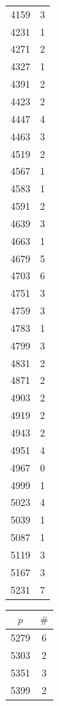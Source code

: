 \documentclass{article}
\theoremstyle{definition}
\begin{document}
\begin{table}[htbp]
\begin{minipage}{0.135\textwidth}
\begin{tabular}{c|c}
        4159 & 3 \\
        4231 & 1 \\
        4271 & 2 \\
        4327 & 1 \\
        4391 & 2 \\
        4423 & 2 \\
        4447 & 4 \\
        4463 & 3 \\
        4519 & 2 \\
        4567 & 1 \\
        4583 & 1 \\
        4591 & 2 \\
        4639 & 3 \\
        4663 & 1 \\
        4679 & 5 \\
        4703 & 6 \\
        4751 & 3 \\
        4759 & 3 \\
        4783 & 1 \\
        4799 & 3 \\
        4831 & 2 \\
        4871 & 2 \\
        4903 & 2 \\
        4919 & 2 \\
        4943 & 2 \\
        4951 & 4 \\
        4967 & 0 \\
        4999 & 1 \\
        5023 & 4 \\
        5039 & 1 \\
        5087 & 1 \\
        5119 & 3 \\
        5167 & 3 \\
        5231 & 7
    \end{tabular}
\end{minipage}\hspace{-2mm}
%
\begin{minipage}{0.135\textwidth}
    \centering
    \begin{tabular}{c|c}
        $p$ & $\#$ \\ \hline
        5279 & 6 \\
        5303 & 2 \\
        5351 & 3 \\
        5399 & 2 \\

\end{tabular}
\end{minipage}
\end{table}
\end{document}
